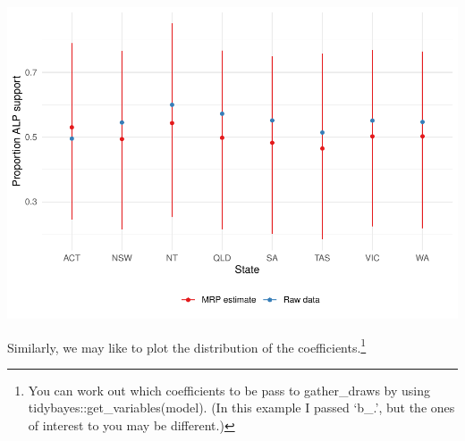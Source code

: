 \documentclass[
]{book}
\begin{document}
\includegraphics{telling_stories_with_data_files/figure-latex/unnamed-chunk-396-1.pdf}

Similarly, we may like to plot the distribution of the coefficients.\footnote{You can work out which coefficients to be pass to gather\_draws by using tidybayes::get\_variables(model). (In this example I passed `b\_.', but the ones of interest to you may be different.)}
\end{document}
